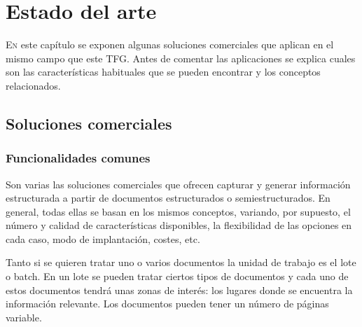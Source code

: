 
\chapter{Estado del arte}
\label{chap:estado-arte}

\lettrine{E}{n} este capítulo se exponen algunas soluciones comerciales que aplican en el mismo campo que este TFG. Antes de comentar las aplicaciones se explica cuales son las características habituales que se pueden encontrar y los conceptos relacionados.

\section{Soluciones comerciales}

\subsection{Funcionalidades comunes}

Son varias las soluciones comerciales que ofrecen capturar y generar información estructurada a partir de documentos estructurados o semiestructurados. En general, todas ellas se basan en los mismos conceptos, variando, por supuesto, el número y calidad de características disponibles, la flexibilidad de las opciones en cada caso, modo de implantación, costes, etc.

Tanto si se quieren tratar uno o varios documentos la unidad de trabajo es el lote o batch. En un lote se pueden tratar ciertos tipos de documentos y cada uno de estos documentos tendrá unas zonas de interés: los lugares donde se encuentra la información relevante. Los documentos pueden tener un número de páginas variable.

